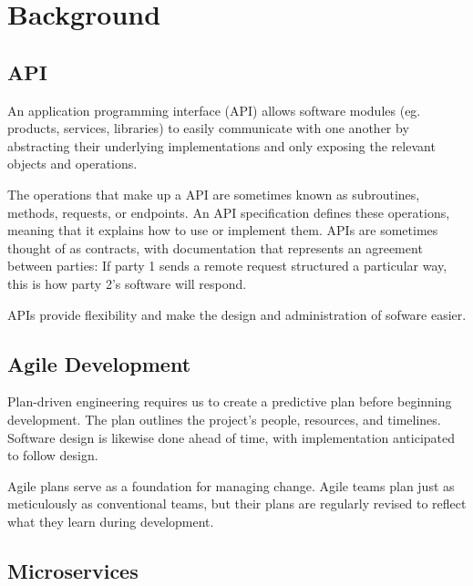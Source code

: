 
%

\chapter{Background}
\label{cha:background}

\section{API} %
\label{sec:api}

An application programming interface (API) allows software modules (eg. products, services, libraries)
to easily communicate with one another by abstracting their underlying implementations and only exposing the relevant objects and operations.

The operations that make up a API are sometimes known as subroutines, methods, requests, or endpoints.
An API specification defines these operations, meaning that it explains how to use or implement them.
APIs are sometimes thought of as contracts, with documentation that represents an agreement between parties:
If party 1 sends a remote request structured a particular way, this is how party 2’s software will respond.

APIs provide flexibility and make the design and administration of sofware  easier.

\section{Agile Development} %
\label{sec:agile_development}

Plan-driven engineering requires us to create a predictive plan before beginning development.
The plan outlines the project's people, resources, and timelines.
Software design is likewise done ahead of time, with implementation anticipated to follow design.

Agile plans serve as a foundation for managing change.
Agile teams plan just as meticulously as conventional teams, but their plans are regularly revised to reflect what they learn during development.

\section{Microservices} %
\label{sec:microservices}

